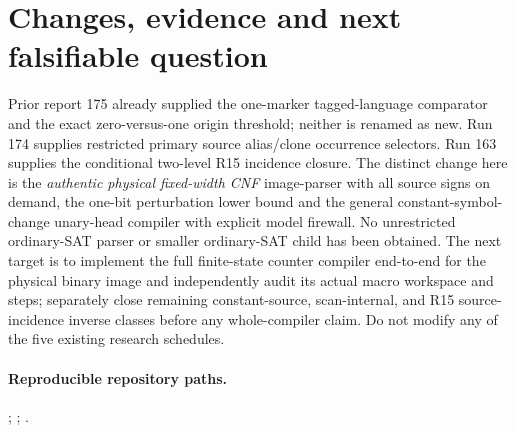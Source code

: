 \documentclass[11pt]{article}
\begin{document}
\section{Changes, evidence and next falsifiable question}
Prior report 175 already supplied the one-marker
tagged-language comparator and the exact
zero-versus-one origin threshold; neither is
renamed as new. Run 174 supplies restricted
primary source alias/clone occurrence selectors.
Run 163 supplies the conditional two-level R15
incidence closure. The distinct change here is
the \emph{authentic physical fixed-width CNF}
image-parser with all source signs on demand,
the one-bit perturbation lower bound and the
general constant-symbol-change unary-head
compiler with explicit model firewall.
No unrestricted ordinary-SAT parser or smaller
ordinary-SAT child has been obtained.
The next target is to implement the full
finite-state counter compiler end-to-end for
the physical binary image and independently
audit its actual macro workspace and steps;
separately close remaining constant-source,
scan-internal, and R15 source-incidence inverse
classes before any whole-compiler claim.
Do not modify any of the five existing
research schedules.

\paragraph{Reproducible repository paths.}
;
;
.


\end{document}
